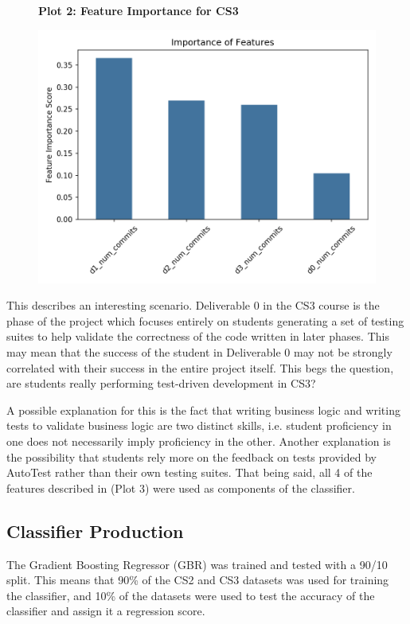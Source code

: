 \documentclass[sigchi]{acmart}
\begin{document}
\begin{figure}
    \centering
    \textbf{Plot 2: Feature Importance for CS3}\par\medskip
  \includegraphics[width=\linewidth]{cs3-feature-importance.png}
\end{figure}

\par This describes an interesting scenario. Deliverable 0 in the CS3 course is the phase of the project which focuses entirely on students generating a set of testing suites to help validate the correctness of the code written in later phases. This may mean that the success of the student in Deliverable 0 may not be strongly correlated with their success in the entire project itself. This begs the question, are students really performing test-driven development in CS3?
\par A possible explanation for this is the fact that writing business logic and writing tests to validate business logic are two distinct skills, i.e. student proficiency in one does not necessarily imply proficiency in the other. Another explanation is the possibility that students rely more on the feedback on tests provided by AutoTest rather than their own testing suites. That being said, all 4 of the features described in (Plot 3) were used as components of the classifier.

\subsection{Classifier Production}

The Gradient Boosting Regressor (GBR) was trained and tested with a 90/10 split. This means that 90\% of the CS2 and CS3 datasets was used for training the classifier, and 10\% of the datasets were used to test the accuracy of the classifier and assign it a regression score. 
\end{document}
